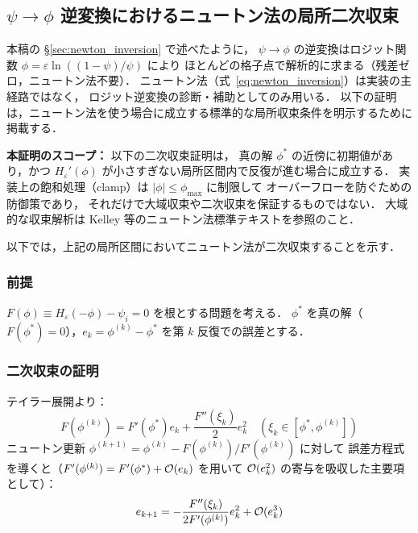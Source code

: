 \subsection{\texorpdfstring{$\psi \to \phi$}{ψ→φ} 逆変換におけるニュートン法の局所二次収束}
\label{app:newton_quad_conv}

本稿の §\ref{sec:newton_inversion} で述べたように，
$\psi \to \phi$ の逆変換はロジット関数 $\phi = \varepsilon\ln((1-\psi)/\psi)$ により
ほとんどの格子点で解析的に求まる（残差ゼロ，ニュートン法不要）．
ニュートン法（式~\eqref{eq:newton_inversion}）は実装の主経路ではなく，
ロジット逆変換の診断・補助としてのみ用いる．
以下の証明は，ニュートン法を使う場合に成立する標準的な局所収束条件を明示するために掲載する．

\textbf{本証明のスコープ：} 以下の二次収束証明は，
真の解 $\phi^*$ の近傍に初期値があり，かつ
$H_\varepsilon'(\phi)$ が小さすぎない局所区間内で反復が進む場合に成立する．
実装上の飽和処理（clamp）は $|\phi| \le \phi_{\max}$ に制限して
オーバーフローを防ぐための防御策であり，
それだけで大域収束や二次収束を保証するものではない．
大域的な収束解析は Kelley \cite{Kelley2003} 等のニュートン法標準テキストを参照のこと．

以下では，上記の局所区間においてニュートン法が二次収束することを示す．

\subsubsection*{前提}

$F(\phi) \equiv H_\varepsilon(-\phi) - \psi_i = 0$ を根とする問題を考える．
$\phi^*$ を真の解（$F(\phi^*)=0$），$e_k = \phi^{(k)} - \phi^*$ を第 $k$ 反復での誤差とする．

\subsubsection*{二次収束の証明}

テイラー展開より：
\[
  F(\phi^{(k)}) = F'(\phi^*) e_k + \frac{F''(\xi_k)}{2} e_k^2
  \quad (\xi_k \in [\phi^*, \phi^{(k)}])
\]
ニュートン更新 $\phi^{(k+1)} = \phi^{(k)} - F(\phi^{(k)})/F'(\phi^{(k)})$ に対して
誤差方程式を導くと（$F'(\phi^{(k)}) = F'(\phi^*) + \mathcal{O}(e_k)$ を用いて
$\mathcal{O}(e_k^2)$ の寄与を吸収した主要項として）：
\[
  e_{k+1} = -\frac{F''(\xi_k)}{2F'(\phi^{(k)})} e_k^2 + \mathcal{O}(e_k^3)
\]

